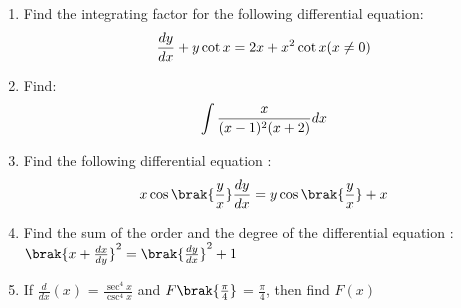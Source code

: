 \begin{enumerate}
\item 
Find the integrating factor for the following differential equation:
\begin{align*}
\centering
\frac{dy}{dx}+ y \cot x = 2x+x^2 \cot x (x \neq 0)
\end{align*}

 
\item 
Find:
\begin{align*}    
\centering
\int\limits\frac{x}{(x-1)^2(x+2)} dx
\end{align*}


\item 
Find the following differential equation :
\begin{align*}
\centering
x\cos \brak{\frac{y}{x}} \frac{dy}{dx}=y \cos \brak{\frac{y}{x}}+x 
\end{align*}

\item Find the sum of the order and the degree of the differential equation :
      $\brak{x+\frac{dx}{dy}}^2 = \brak{\frac{dy}{dx}}^2 + 1$ 
      \item  If $\frac{d}{dx}(x)$ = $\frac{\sec ^4 x}{\csc ^4 x}$ and 
      $F\brak{\frac{\pi}{4}}$ = $\frac{\pi}{4}$, then find $F(x)$
      

\end{enumerate}
